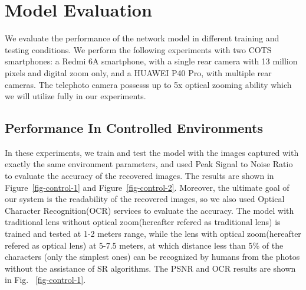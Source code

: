 \section{Model Evaluation}
\label{sec-evaluation}
We evaluate the performance of the network model in different training and testing conditions. We perform the following experiments with two COTS smartphones: a Redmi 6A smartphone, with a single rear camera with 13 million pixels and digital zoom only, and a HUAWEI P40 Pro, with multiple rear cameras. The telephoto camera possesss up to 5x optical zooming ability which we will utilize fully in our experiments.
 
\subsection{Performance In Controlled Environments}
In these experiments, we train and test the model with the images captured with exactly the same environment parameters, and used Peak Signal to Noise Ratio to evaluate the accuracy of the recovered images. The results are shown in Figure~\ref{fig-control-1} and Figure~\ref{fig-control-2}. Moreover, the ultimate goal of our system is the readability of the recovered images, so we also used Optical Character Recognition(OCR) services to evaluate the accuracy. The model with traditional lens without optical zoom(hereafter refered as traditional lens) is trained and tested at 1-2 meters range, while the lens with optical zoom(hereafter refered as optical lens) at 5-7.5 meters, at which distance less than 5\% of the characters (only the simplest ones) can be recognized by humans from the photos without the assistance of SR algorithms. The PSNR and OCR results are shown in Fig. ~\ref{fig-control-1}.

